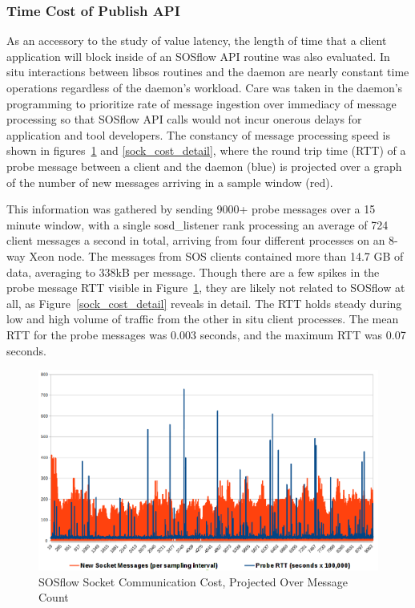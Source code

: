 \subsubsection{Time Cost of Publish API} %
%
As an accessory to the study of value latency, the length of time that
a client application will block inside of an SOSflow API routine was
also evaluated.
%
In situ interactions between libsos routines and the daemon are
nearly constant time operations regardless of the daemon's workload.
%
Care was taken in the daemon's programming to prioritize rate of message
ingestion over immediacy of message processing so that SOSflow API calls
would not incur onerous delays for application and tool developers.
%
The constancy of message processing speed is shown in
figures~\ref{sock_cost} and \ref{sock_cost_detail}, where the round
trip time (RTT) of a probe message between a client and the daemon
(blue) is projected over a graph of the number of new messages
arriving in a sample window (red).
%
\par
%
This information was gathered by sending 9000+ probe messages over a 15
minute window, with a single sosd\_listener rank processing an average
of 724 client messages a second in total, arriving from four different
processes on an 8-way Xeon node.
%
The messages from SOS clients contained more than 14.7 GB of data,
averaging to 338kB per message.
%
Though there are a few spikes in the probe message RTT visible in
Figure~\ref{sock_cost}, they are likely not related to SOSflow at all,
as Figure~\ref{sock_cost_detail} reveals in detail.
%
The RTT holds steady during low and high volume of traffic from the
other in situ client processes.
%
The mean RTT for the probe messages was 0.003 seconds, and the maximum
RTT was 0.07 seconds.
%
\begin{figure}[h]
\centering
\includegraphics[width=\columnwidth]{images/icebox_api_cost_when_slam.png}
\caption{SOSflow Socket Communication Cost, Projected Over Message Count}
\label{sock_cost}
\end{figure}


